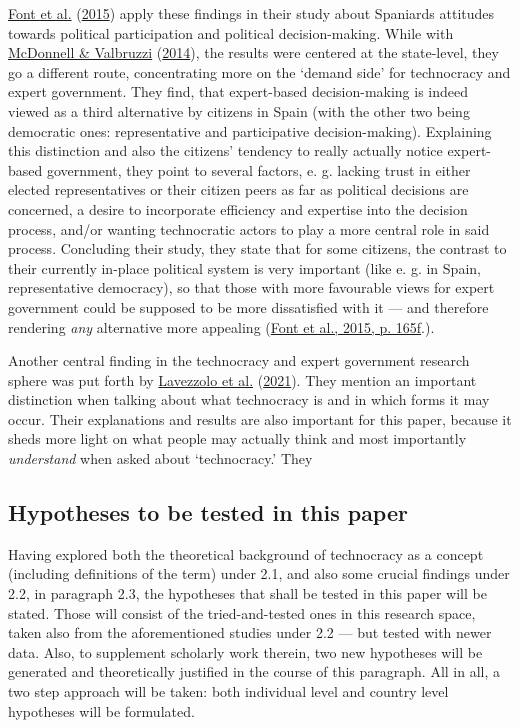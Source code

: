 \documentclass[
  12pt,
  english,
]{article}
\begin{document}
\protect\hyperlink{ref-font2015participation}{Font et al.}
(\protect\hyperlink{ref-font2015participation}{2015}) apply these
findings in their study about Spaniards attitudes towards political
participation and political decision-making. While with
\protect\hyperlink{ref-mcdonnell2014defining}{McDonnell \& Valbruzzi}
(\protect\hyperlink{ref-mcdonnell2014defining}{2014}), the results were
centered at the state-level, they go a different route, concentrating
more on the `demand side' for technocracy and expert government. They
find, that expert-based decision-making is indeed viewed as a third
alternative by citizens in Spain (with the other two being democratic
ones: representative and participative decision-making). Explaining this
distinction and also the citizens' tendency to really actually notice
expert-based government, they point to several factors, e. g. lacking
trust in either elected representatives or their citizen peers as far as
political decisions are concerned, a desire to incorporate efficiency
and expertise into the decision process, and/or wanting technocratic
actors to play a more central role in said process. Concluding their
study, they state that for some citizens, the contrast to their
currently in-place political system is very important (like e. g. in
Spain, representative democracy), so that those with more favourable
views for expert government could be supposed to be more dissatisfied
with it --- and therefore rendering \emph{any} alternative more
appealing (\protect\hyperlink{ref-font2015participation}{Font et al.,
2015, p. 165f}.).

Another central finding in the technocracy and expert government
research sphere was put forth by
\protect\hyperlink{ref-lavezzolo2021will}{Lavezzolo et al.}
(\protect\hyperlink{ref-lavezzolo2021will}{2021}). They mention an
important distinction when talking about what technocracy is and in
which forms it may occur. Their explanations and results are also
important for this paper, because it sheds more light on what people may
actually think and most importantly \emph{understand} when asked about
`technocracy.' They

\hypertarget{hypotheses-to-be-tested-in-this-paper}{%
\subsection{Hypotheses to be tested in this
paper}\label{hypotheses-to-be-tested-in-this-paper}}

Having explored both the theoretical background of technocracy as a
concept (including definitions of the term) under 2.1, and also some
crucial findings under 2.2, in paragraph 2.3, the hypotheses that shall
be tested in this paper will be stated. Those will consist of the
tried-and-tested ones in this research space, taken also from the
aforementioned studies under 2.2 --- but tested with newer data. Also,
to supplement scholarly work therein, two new hypotheses will be
generated and theoretically justified in the course of this paragraph.
All in all, a two step approach will be taken: both individual level and
country level hypotheses will be formulated.
\end{document}
